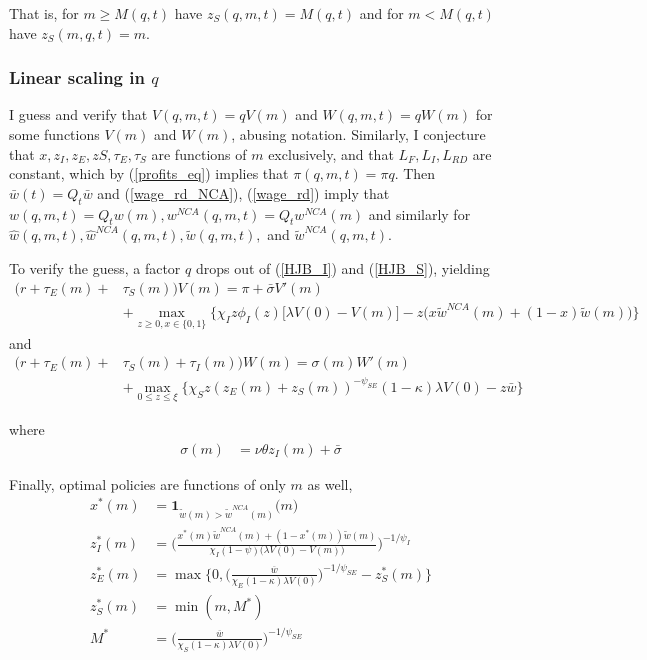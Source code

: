 \documentclass[12pt,english]{article}
\theoremstyle{remark}
\begin{document}
That is, for $m \ge M(q,t)$ have $z_S(q,m,t) = M(q,t)$ and for $m < M(q,t)$ have $z_S(m,q,t) = m$. 


\subsubsection{Linear scaling in $q$}

I guess and verify that $V(q,m,t) = q V(m)$ and $W(q,m,t) = qW(m)$ for some functions $V(m)$ and $W(m)$, abusing notation. Similarly, I conjecture that $x,z_I,z_E,zS,\tau_E,\tau_S$ are functions of $m$ exclusively, and that $L_F,L_I,L_{RD}$ are constant, which by (\ref{profits_eq}) implies that $\pi(q,m,t) = \pi q$. Then $\bar{w}(t) = Q_t \bar{w}$ and (\ref{wage_rd_NCA}), (\ref{wage_rd}) imply that $w(q,m,t) = Q_t w(m),w^{NCA}(q,m,t) = Q_tw^{NCA}(m)$ and similarly for $\hat{w}(q,m,t),\hat{w}^{NCA}(q,m,t),\tilde{w}(q,m,t),$ and $\tilde{w}^{NCA}(q,m,t)$. 

To verify the guess, a factor $q$ drops out of (\ref{HJB_I}) and (\ref{HJB_S}), yielding
\begin{align}
(r + \tau_E(m) + &\tau_S(m)) V(m) = \pi + \bar{\sigma}V'(m) \nonumber \\
&+ \max_{z \ge 0, x \in \{0,1\}} \Big\{  \chi_I z \phi_I(z) \Big[\lambda V(0) - V(m) \Big] - z \Big(x \tilde{w}^{NCA}(m) + (1-x) \tilde{w}(m) \Big) \Big\} \label{BGP_HJB_I}
\end{align} 
and 
\begin{align}
(r + \tau_E(m) + &\tau_S(m) + \tau_I(m))W(m) = \sigma(m) W'(m) \nonumber \\
&+ \max_{0 \le z \le \xi} \Big\{  \chi_S z (z_E(m) + z_S(m))^{-\psi_{SE}} (1-\kappa) \lambda V(0) - z \bar{w} \Big\} \label{BGP_HJB_S} 
\end{align}

where
\begin{align}
\sigma(m) &= \nu \theta z_I(m) + \bar{\sigma} 
\end{align}

Finally, optimal policies are functions of only $m$ as well, 
\begin{align}
x^*(m) &= \textbf{1}_{\tilde{w}(m) > \tilde{w}^{NCA}(m)} \big(m\big) \\
z_I^*(m) &= \Bigg( \frac{x^*(m) \tilde{w}^{NCA}(m) + (1-x^*(m)) \tilde{w}(m)}{\chi_I (1-\psi) \Big(\lambda V(0) - V(m) \Big)} \Bigg)^{-1/\psi_I} \\
z_E^*(m) &= \max \Bigg\{0, \Big(\frac{\overline{w}}{\chi_E (1-\kappa) \lambda V(0)} \Big)^{-1 / \psi_{SE}} - z_S^*(m)\Bigg\} \\
z_S^*(m) &= \min(m,M^*) \\
M^* &= \Big(\frac{\overline{w}}{\chi_S (1-\kappa) \lambda V(0)} \Big)^{-1 / \psi_{SE}}
\end{align}
\end{document}
